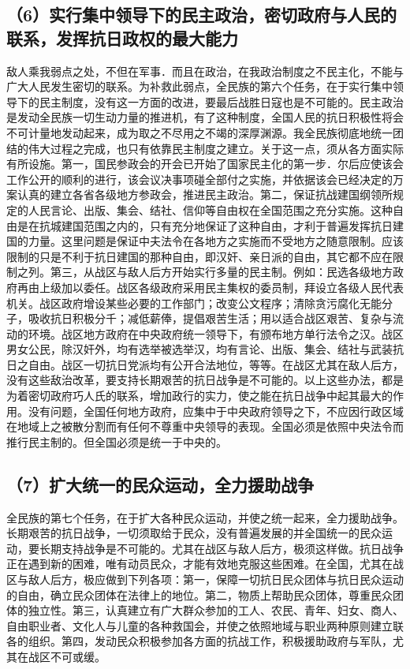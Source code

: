 \subsection{（6）实行集中领导下的民主政治，密切政府与人民的联系，发挥抗日政权的最大能力}

敌人乘我弱点之处，不但在军事．而且在政治，在我政治制度之不民主化，不能与广大人民发生密切的联系。为补救此弱点，全民族的第六个任务，在于实行集中领导下的民主制度，没有这一方面的改进，要最后战胜日寇也是不可能的。民主政治是发动全民族一切生动力量的推进机，有了这种制度，全国人民的抗日积极性将会不可计量地发动起来，成为取之不尽用之不竭的深厚渊源。我全民族彻底地统一团结的伟大过程之完成，也只有依靠民主制度之建立。关于这一点，须从各方面实际有所设施。第一，国民参政会的开会已开始了国家民主化的第一步．尔后应使该会工作公开的顺利的进行，该会议决事项碰全部付之实施，并依据该会已经决定的万案认真的建立各省各级地方参政会，推进民主政治。第二，保证抗战建国纲领所规定的人民言论、出版、集会、结社、信仰等自由权在全国范围之充分实施。这种自由是在抗城建国范围之内的，只有充分地保证了这种自由，才利于普遍发挥抗日建国的力量。这里问题是保证中夫法令在各地方之实施而不受地方之随意限制。应该限制的只是不利于抗日建国的那种自由，即汉奸、亲日派的自由，其它都不应在限制之列。第三，从战区与敌人后方开始实行多量的民主制。例如：民选各级地方政府再由上级加以委任。战区各级政府采用民主集权的委员制，拜设立各级人民代表机关。战区政府增设某些必要的工作部门；改变公文程序；清除贪污腐化无能分子，吸收抗日积极分千；减低薪俸，提倡艰苦生活；用以适合战区艰苦、复杂与流动的环境。战区地方政府在中央政府统一领导下，有颁布地方单行法令之汉。战区男女公民，除汉奸外，均有选举被选举汉，均有言论、出版、集会、结社与武装抗日之自由。战区一切抗日党派均有公开合法地位，等等。在战区尤其在敌人后方，没有这些敌治改革，要支持长期艰苦的抗日战争是不可能的。以上这些办法，都是为着密切政府巧人氏的联系，增加政行的实力，使之能在抗日战争中起其最大的作用。没有问题，全国任何地方政府，应集中于中央政府领导之下，不应因行政区域在地域上之被散分割而有任何不尊重中央领导的表现。全国必须是依照中央法令而推行民主制的。但全国必须是统一于中央的。

\subsection{（7）扩大统一的民众运动，全力援助战争}

全民族的第七个任务，在于扩大各种民众运动，并使之统一起来，全力援助战争。长期艰苦的抗日战争，一切须取给于民众，没有普遍发展的并全国统一的民众运动，要长期支持战争是不可能的。尤其在战区与敌人后方，极须这样做。抗日战争正在遇到新的困难，唯有动员民众，才能有效地克服这些困难。在全国，尤其在战区与敌人后方，极应做到下列各项：第一，保障一切抗日民众团体与抗日民众运动的自由，确立民众团体在法律上的地位。第二，物质上帮助民众团体，尊重民众团体的独立性。第三，认真建立有广大群众参加的工人、农民、青年、妇女、商人、自由职业者、文化人与儿童的各种救国会，并使之依照地域与职业两种原则建立联各的组织。第四，发动民众积极参加各方面的抗战工作，积极援助政府与军队，尤其在战区不可或缓。

